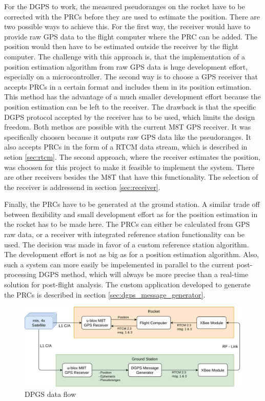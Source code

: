 For the DGPS to work, the measured pseudoranges on the rocket have to be corrected with the PRCs before they are used to estimate the position.
There are two possible ways to achieve this.
For the first way, the receiver would have to provide raw GPS data to the flight computer where the PRC can be added.
The position would then have to be estimated outside the receiver by the flight computer.
The challenge with this approach is, that the implementation of a position estimation algorithm from raw GPS data is huge development effort, especially on a microcontroller.
The second way is to choose a GPS receiver that accepts PRCs in a certain format and includes them in its position estimation.
This method has the advantage of a much smaller development effort because the position estimation can be left to the receiver.
The drawback is that the specific DGPS protocol accepted by the receiver has to be used, which limits the design freedom.
Both methos are possible with the current M8T GPS receiver.
It was specifically choosen because it outputs raw GPS data like the pseudoranges.
It also accepts PRCs in the form of a RTCM data stream, which is described in setion \ref{sec:rtcm}.
The second approach, where the receiver estimates the position, was choosen for this project to make it feasible to implement the system.
There are other receivers besides the M8T that have this functionality.
The selection of the receiver is addressend in section \ref{sec:receiver}.

Finally, the PRCs have to be generated at the ground station.
A similar trade off between flexibility and small development effort as for the position estimation in the rocket has to be made here.
The PRCs can either be calculated from GPS raw data, or a receiver with integrated reference station functionality can be used.
The decision was made in favor of a custom reference station algorithm.
The development effort is not as big as for a position estimation algorithm.
Also, such a system can more easily be impelemented in parallel to the current post-processing DGPS method, which will always be more precise than a real-time solution for post-flight analysis.
The custom application developed to generate the PRCs is described in section \ref{sec:dgps_message_generator}.

\begin{figure}[ht]
 \centering
 \includegraphics[width=\textwidth]{images/DGPS_System_Overview.png}
 \caption{DPGS data flow}
 \label{fig:data_flow}
\end{figure}

